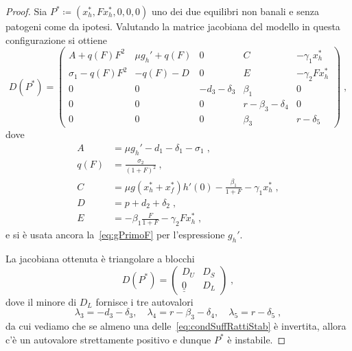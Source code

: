 \begin{proof}
Sia $P^* \coloneq (x_h^*, F x_h^*, 0, 0,0)$ uno dei due equilibri non banali e senza patogeni come da ipotesi.
Valutando la matrice jacobiana del modello in questa configurazione si ottiene
$$D(P^*) =
\begin{pmatrix}
A + q(F) F^2 & \mu g_h' + q(F) & 0 & C & - \gamma_1 x_h^* \\
\sigma_1 -q(F) F^2 & -q(F) -D & 0 & E & - \gamma_2 F x_h^* \\
0 & 0 & -d_3 -\delta_3 & \beta_1 & 0 \\
0 & 0 & 0 & r - \beta_3 -\delta_4 & 0 \\
0 & 0 & 0 & \beta_3 & r -\delta_5
\end{pmatrix} \; ,
$$
dove
\begin{equation}
\begin{split}
A &= \mu g_h' - d_1 -\delta_1 -\sigma_1 \; , \\
q(F) &= \frac{\sigma_2}{(1+F)^2} \: , \\
C &= \mu g(x_h^* + x_f^*) h'(0) - \frac{\beta_1}{1+F} - \gamma_1 x_h^* \; , \\
D &= p + d_2 + \delta_2 \; , \\
E &= -\beta_1 \frac{F}{1+F} -\gamma_2 F x_h^* \; ,
\end{split}
\label{eq:jacoCmpts}
\end{equation}
e si è usata ancora la~\eqref{eq:gPrimoF} per l'espressione $g_h'$.

La jacobiana ottenuta è triangolare a blocchi
$$ D(P^*) =
\begin{pmatrix}
D_U & D_S \\
\underline{\underline{0}} & D_L
\end{pmatrix} \; ,
$$
dove il minore di $D_L$ fornisce i tre autovalori
\begin{equation}
\lambda_3 = -d_3 -\delta_3 , \quad %
\lambda_4 = r -\beta_3 -\delta_4 , \quad
\lambda_5 = r -\delta_5 \; ,
\label{eq:ultimi3}
\end{equation}
da cui vediamo che se almeno una delle~\eqref{eq:condSuffRattiStab} è invertita, allora c'è un autovalore
strettamente positivo e dunque $P^*$ è instabile.


\end{proof}
